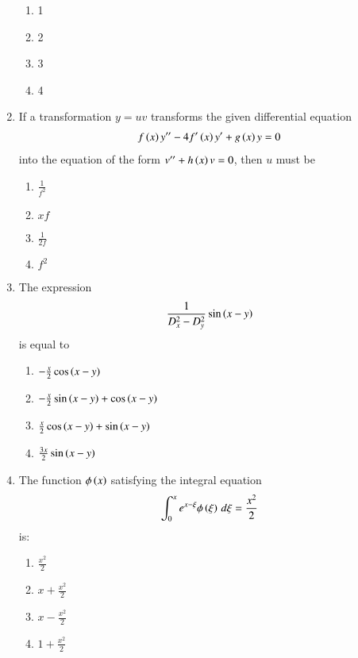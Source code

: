\documentclass[journal,12pt,twocolumn]{IEEEtran}
\theoremstyle{remark}
\begin{document}
\begin{enumerate}
\begin{enumerate}
    \item 1
    \item 2
    \item 3
    \item 4
\end{enumerate}

\item If a transformation $y = u v$ transforms the given differential equation 
\begin{align}
f \left(x\right) y^{\prime\prime} - 4 f^\prime \left(x\right) y^\prime + g \left(x\right) y = 0 
\end{align}
into the equation of the form $v^{\prime\prime} + h \left(x\right) v = 0$, then $u$ must be

\begin{enumerate}
    \item $\frac{1}{f^2}$
    \item $x f$
    \item $\frac{1}{2 f}$
    \item $f^2$
\end{enumerate}

\item The expression 
\begin{align}
\frac{1}{D_x^2 - D_y^2} \sin \left(x - y\right)
\end{align}
is equal to

\begin{enumerate}
    \item $-\frac{x}{2} \cos \left(x - y\right)$
    \item $-\frac{x}{2} \sin \left(x - y\right) + \cos \left(x - y\right)$
    \item $\frac{x}{2} \cos \left(x - y\right) + \sin \left(x - y\right)$
    \item $\frac{3x}{2} \sin \left(x - y\right)$
\end{enumerate}

\item The function $\phi \left(x\right)$ satisfying the integral equation
\begin{align}
\int_0^x e^{x-\xi} \phi \left(\xi\right) \, d\xi = \frac{x^2}{2}
\end{align}
is:

\begin{enumerate}
    \item $\frac{x^2}{2}$
    \item $x + \frac{x^2}{2}$
    \item $x - \frac{x^2}{2}$
    \item $1 + \frac{x^2}{2}$
\end{enumerate}


\end{enumerate}
\end{document}
